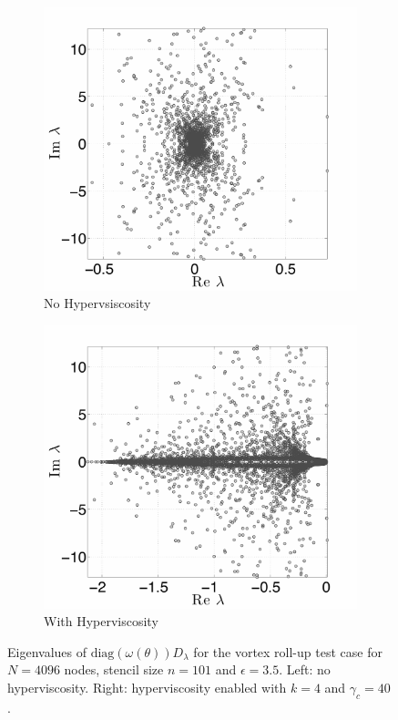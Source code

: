 \begin{figure}[htb]
\begin{center}
\begin{subfigure}[b]{0.45\textwidth}
	\centering
	\includegraphics[width=1.0\textwidth]{figures/paper1/figures/vortex_rollup/eigs_N4096_n101_noHV.pdf}
	\caption{No Hypervsiscosity}
	\label{fig:vortex_eigs_nohv}
\end{subfigure}
\begin{subfigure}[b]{0.45\textwidth}
	\centering
	\includegraphics[width=1.0\textwidth]{figures/paper1/figures/vortex_rollup/eigs_N4096_n101_HV_k4_gamma40.pdf}
	\caption{With Hyperviscosity}
	\label{fig:vortex_eigs_hv}
\end{subfigure}
\caption{Eigenvalues of $\text{diag}(\omega(\theta)) D_\lambda$ for the vortex roll-up test case for $N=4096$ nodes, stencil size $n=101$ and $\epsilon = 3.5$. Left: no hyperviscosity. Right: hyperviscosity enabled with $k=4$ and $\gamma_c = 40$. }
\label{fig:eig_vortex}
\end{center}
\end{figure}

